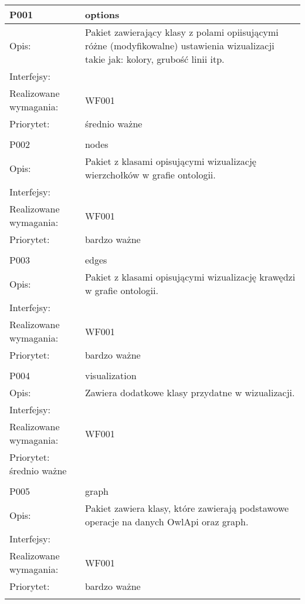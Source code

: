 \documentclass[a4paper,10pt]{article}
\begin{document}
\begin{center}
\begin{tabular}{|m{3cm}|m{9cm}|} \hline

P001 & options\\ \hline
Opis: & Pakiet zawierający klasy z polami opiisującymi różne (modyfikowalne) ustawienia wizualizacji takie jak: kolory, grubość linii itp.     \\ \hline
Interfejsy: &     \\ \hline
Realizowane wymagania: & WF001 \\ \hline
Priorytet: & średnio ważne \\ \hline

\multicolumn{2}{c}{} \\
 \hline

P002 & nodes\\ \hline
Opis: & Pakiet z klasami opisującymi wizualizację wierzchołków w grafie ontologii.    \\ \hline
Interfejsy: &     \\ \hline
Realizowane wymagania: & WF001 \\ \hline
Priorytet: & bardzo ważne \\ \hline

\multicolumn{2}{c}{} \\
 \hline

P003 & edges\\ \hline
Opis: & Pakiet z klasami opisującymi wizualizację krawędzi w grafie ontologii.    \\ \hline
Interfejsy: &     \\ \hline
Realizowane wymagania: & WF001 \\ \hline
Priorytet: & bardzo ważne \\ \hline

\multicolumn{2}{c}{} \\
 \hline

P004 & visualization\\ \hline
Opis: & Zawiera dodatkowe klasy przydatne w wizualizacji.\\ \hline
Interfejsy: &     \\ \hline
Realizowane wymagania: & WF001 \\ \hline
Priorytet: średnio ważne&  \\ \hline

\multicolumn{2}{c}{} \\
 \hline

P005 & graph\\ \hline
Opis: & Pakiet zawiera klasy, które zawierają podstawowe operacje na danych OwlApi oraz graph. \\ \hline
Interfejsy: &     \\ \hline
Realizowane wymagania: & WF001 \\ \hline
Priorytet: & bardzo ważne \\ \hline

\multicolumn{2}{c}{} \\
 \hline

\end{tabular}

\end{center}
\end{document}
